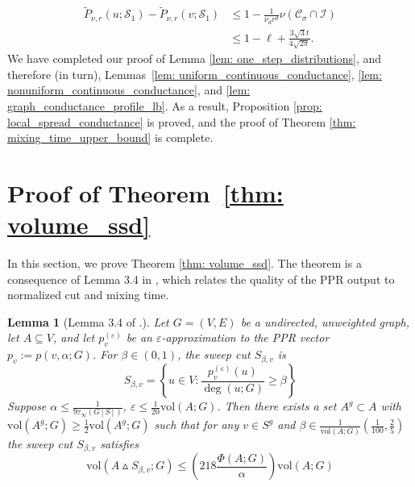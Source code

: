 \documentclass[11pt,twoside]{article}
\newtheorem{lemma}{Lemma}
\theoremstyle{definition}
\newcommand{\set}[1]{\left\{#1\right\}}
\newcommand{\vol}{\mathrm{vol}}
\newcommand{\1}{\mathbbm{1}}
\newcommand{\Sset}{\mathcal{S}}
\newcommand{\Cset}{\mathcal{C}}
\newcommand{\Csig}{\Cset_{\sigma}}
\begin{document}
\begin{align*}
\widetilde{P}_{\nu,r}(u; \Sset_1) - \widetilde{P}_{\nu,r}(v; \Sset_1) & \leq  1 - \frac{1}{\nu_d r^d} \nu(\Csig \cap \mathcal{I}) \\
& \leq 1 - \ell + \frac{3 \sqrt{3} t}{4\sqrt{2\pi}}.
\end{align*}
We have completed our proof of Lemma \ref{lem: one_step_distributions}, and therefore (in turn), Lemmas~\ref{lem: uniform_continuous_conductance}, \ref{lem: nonuniform_continuous_conductance}, and \ref{lem: graph_conductance_profile_lb}. As a result, Proposition \ref{prop: local_spread_conductance} is proved, and the proof of Theorem \ref{thm: mixing_time_upper_bound} is complete.

\section{Proof of Theorem~\ref{thm: volume_ssd}}
\label{sec:proof_of_volume_ssd}

In this section, we prove Theorem \ref{thm: volume_ssd}. The theorem is a consequence of Lemma 3.4 in \citet{zhu2013}, which relates the quality of the PPR output to normalized cut and mixing time. 
\begin{lemma}[Lemma 3.4 of \citet{zhu2013}.]
	\label{lem:zhu}
	Let $G = (V,E)$ be a undirected, unweighted graph, let $A \subseteq V$, and let $p_v^{(\varepsilon)}$ be an $\varepsilon$-approximation to the PPR vector $p_v := p(v,\alpha;G)$. For $\beta \in (0,1)$,  the sweep cut $S_{\beta,v}$ is
	\begin{equation*}
	S_{\beta,v} = \set{u \in V: \frac{p_v^{(\varepsilon)}(u)}{\deg(u;G)} \geq \beta}
	\end{equation*} Suppose $\alpha \leq \frac{1}{9 \tau_{\infty}(G[S])}$,  $\varepsilon \leq \frac{1}{20}\vol(A;G)$. Then there exists a set $A^g \subset A$ with $\vol(A^g;G) \geq \frac{1}{2}\vol(A^g;G)$ such that for any $v \in S^g$ and $\beta \in \frac{1}{\vol(A;G)}(\frac{1}{100},\frac{2}{5})$ the sweep cut $S_{\beta,v}$ satisfies
	\begin{equation*}
	\vol(A \vartriangle S_{\beta,v};G) \leq \left(218\frac{\Phi(A;G)}{\alpha}\right) \vol(A;G)
	\end{equation*}
\end{lemma}
\end{document}
